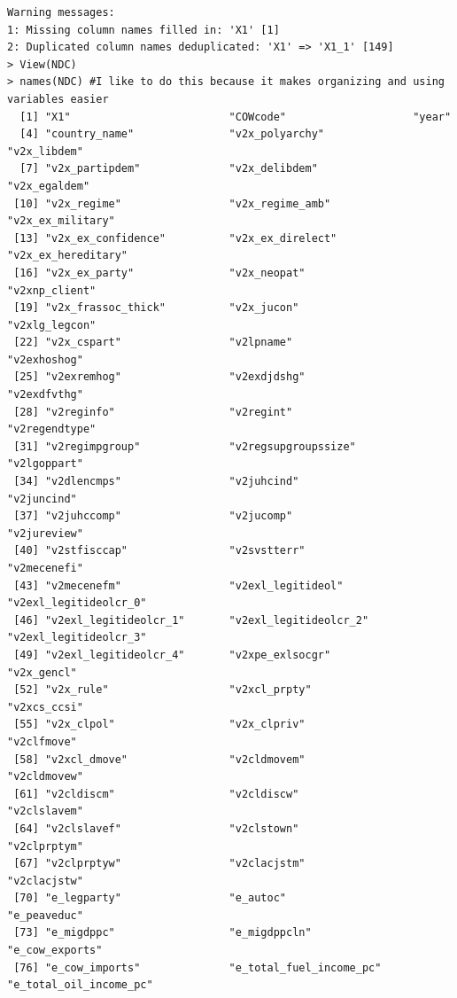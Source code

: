 \documentclass[12pt]{article}
\begin{document}
\begin{verbatim}
Warning messages:
1: Missing column names filled in: 'X1' [1] 
2: Duplicated column names deduplicated: 'X1' => 'X1_1' [149] 
> View(NDC)
> names(NDC) #I like to do this because it makes organizing and using variables easier
  [1] "X1"                         "COWcode"                    "year"                      
  [4] "country_name"               "v2x_polyarchy"              "v2x_libdem"                
  [7] "v2x_partipdem"              "v2x_delibdem"               "v2x_egaldem"               
 [10] "v2x_regime"                 "v2x_regime_amb"             "v2x_ex_military"           
 [13] "v2x_ex_confidence"          "v2x_ex_direlect"            "v2x_ex_hereditary"         
 [16] "v2x_ex_party"               "v2x_neopat"                 "v2xnp_client"              
 [19] "v2x_frassoc_thick"          "v2x_jucon"                  "v2xlg_legcon"              
 [22] "v2x_cspart"                 "v2lpname"                   "v2exhoshog"                
 [25] "v2exremhog"                 "v2exdjdshg"                 "v2exdfvthg"                
 [28] "v2reginfo"                  "v2regint"                   "v2regendtype"              
 [31] "v2regimpgroup"              "v2regsupgroupssize"         "v2lgoppart"                
 [34] "v2dlencmps"                 "v2juhcind"                  "v2juncind"                 
 [37] "v2juhccomp"                 "v2jucomp"                   "v2jureview"                
 [40] "v2stfisccap"                "v2svstterr"                 "v2mecenefi"                
 [43] "v2mecenefm"                 "v2exl_legitideol"           "v2exl_legitideolcr_0"      
 [46] "v2exl_legitideolcr_1"       "v2exl_legitideolcr_2"       "v2exl_legitideolcr_3"      
 [49] "v2exl_legitideolcr_4"       "v2xpe_exlsocgr"             "v2x_gencl"                 
 [52] "v2x_rule"                   "v2xcl_prpty"                "v2xcs_ccsi"                
 [55] "v2x_clpol"                  "v2x_clpriv"                 "v2clfmove"                 
 [58] "v2xcl_dmove"                "v2cldmovem"                 "v2cldmovew"                
 [61] "v2cldiscm"                  "v2cldiscw"                  "v2clslavem"                
 [64] "v2clslavef"                 "v2clstown"                  "v2clprptym"                
 [67] "v2clprptyw"                 "v2clacjstm"                 "v2clacjstw"                
 [70] "e_legparty"                 "e_autoc"                    "e_peaveduc"                
 [73] "e_migdppc"                  "e_migdppcln"                "e_cow_exports"             
 [76] "e_cow_imports"              "e_total_fuel_income_pc"     "e_total_oil_income_pc"     

\end{verbatim}
\end{document}
